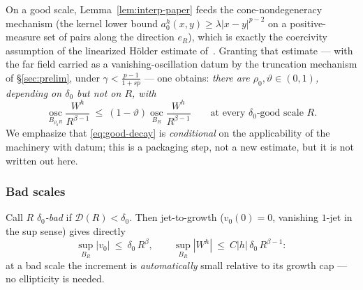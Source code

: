 \documentclass[11pt]{amsart}
\theoremstyle{plain}
\theoremstyle{definition}
\theoremstyle{remark}
\begin{document}
\noindent On a good scale, Lemma~\ref{lem:interp-paper} feeds the
cone-nondegeneracy mechanism \textnormal{(}the kernel lower bound
$a_0^h(x,y)\ge\lambda|x-y|^{p-2}$ on a positive-measure set of pairs along
the direction $e_R$\textnormal{)}, which is exactly the coercivity
assumption of the linearized H\"older estimate of~\cite[\S7]{GJS}. Granting
that estimate --- with the far field carried as a vanishing-oscillation
datum by the truncation mechanism of \S\ref{sec:prelim}, under
$\gamma<\frac{p-1}{1+sp}$ --- one obtains: \emph{there are
$\rho_0,\vartheta\in(0,1)$, depending on $\delta_0$ but not on $R$, with}
\begin{equation}\label{eq:good-decay}
  \operatorname*{osc}_{B_{\rho_0R}}\frac{W^h}{R^{\beta-1}}
  \ \le\ (1-\vartheta)\operatorname*{osc}_{B_{R}}\frac{W^h}{R^{\beta-1}}
  \qquad\text{at every $\delta_0$-good scale }R .
\end{equation}
We emphasize that \eqref{eq:good-decay} is \emph{conditional} on the
applicability of the \cite[\S7]{GJS} machinery with datum; this is a
packaging step, not a new estimate, but it is not written out here.

\subsubsection*{Bad scales}
Call $R$ \emph{$\delta_0$-bad} if $\mathcal D(R)<\delta_0$. Then
jet-to-growth \textnormal{(}$v_0(0)=0$, vanishing $1$-jet in the sup
sense\textnormal{)} gives directly
\begin{equation}\label{eq:bad-small}
  \sup_{B_R}|v_0|\ \le\ \delta_0\,R^{\beta},
  \qquad
  \sup_{B_R}|W^h|\ \le\ C|h|\,\delta_0\,R^{\beta-1}:
\end{equation}
at a bad scale the increment is \emph{automatically} small relative to its
growth cap --- no ellipticity is needed.
\end{document}
